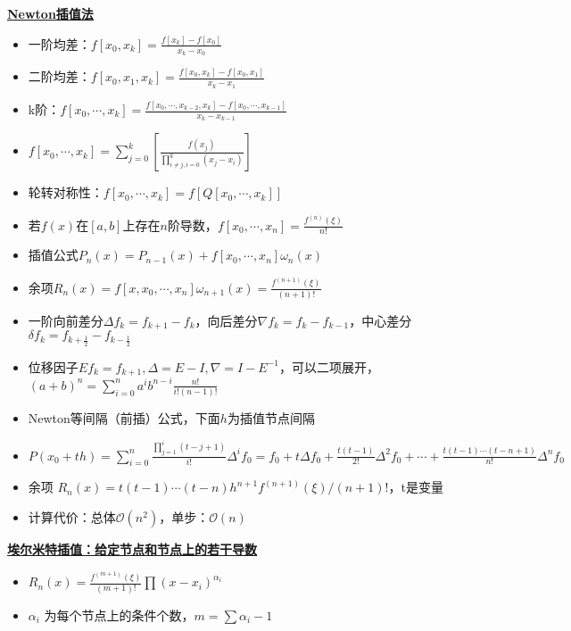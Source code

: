 \documentclass[UTF8,a4paper,landscape,compress]{paper}
\renewcommand{\subsection}[1]{{\small\textbf{\underline{#1}}}\\ }
\newcommand{\List}[1]{\begin{itemize}[fullwidth,itemindent=0em] #1 \end{itemize}}
\begin{document}
\begin{multicols}{4}
    \subsection{Newton插值法}
    \List{
        \item {一阶均差：$f[x_0,x_k] = \frac{f[x_k] - f[x_0]}{x_k-x_0}$}
        \item {二阶均差：$f[x_0,x_1,x_k] = \frac{f[x_0,x_k] - f[x_0,x_1]}{x_k-x_1}$}
        \item {k阶：$f[x_0,\cdots, x_k] = \frac{f[x_0,\cdots,x_{k-2},x_k] - f[x_0,\cdots, x_{k-1}]}
        {x_k-x_{k-1}}$}
        \item {$f[x_0,\cdots,x_k] = \sum^k_{j=0}[\frac{f(x_j)}{\prod^k_{i\ne j,i=0}(x_j-x_i)}]$}
        \item {轮转对称性：$f[x_0,\cdots,x_k] = f[Q[x_0,\cdots,x_k]]$}
        \item {若$f(x)$在$[a,b]$上存在$n$阶导数，$f[x_0,\cdots,x_n]=\frac{f^{(n)}(\xi)}{n!}$}
        \item {插值公式$P_n(x) = P_{n-1}(x) + f[x_0,\cdots,x_n] \omega_n(x)$}
        \item {余项$R_n(x) = f[x,x_0,\cdots,x_n]\omega_{n+1}(x) = \frac{f^{(n+1)}(\xi)}{(n+1)!}$}
        \item {一阶向前差分$\Delta f_k = f_{k+1} - f_k$，向后差分$\nabla f_k = f_k - f_{k-1}$，中心差分$\delta f_k = f_{k+\frac{1}{2}} - f_{k-\frac{1}{2}}$}
        \item {位移因子$Ef_k=f_{k+1}, \Delta = E - I, \nabla = I - E^{-1}$，可以二项展开，$(a+b)^n = \sum_{i=0}^n a^i b^{n-i} \frac{n!}{i!(n-1)!}$}
        \item {Newton等间隔（前插）公式，下面$h$为插值节点间隔}
        \item {$P(x_0+th) = \sum_{i=0}^n\frac{\prod_{j=1}^i(t-j+1)}{i!}\Delta^if_0 = f_0 + t\Delta f_0 + \frac{t(t-1)}{2!}\Delta^2f_0 + \cdots + \frac{t(t-1)\cdots(t-n+1)}{n!}\Delta^nf_0$ }
        \item {余项 $R_n(x) = t(t-1)\cdots(t-n)h^{n+1}f^{(n+1)}(\xi)/(n+1)!$，t是变量}
		\item {计算代价：总体$\mathcal O(n^2)$，单步：$\mathcal O(n)$}
        }
    \subsection{埃尔米特插值：给定节点和节点上的若干导数}
    \List{
        \item {$R_n(x) = \frac{f^{(m+1)}(\xi)}{(m+1)!}\prod(x-x_i)^{\alpha_i}$}
        \item {$\alpha_i$ 为每个节点上的条件个数，$m = \sum \alpha_i - 1$}
    }

\end{multicols}
\end{document}
